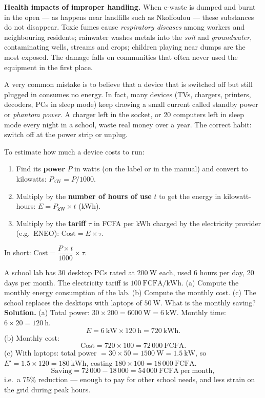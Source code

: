 \documentclass[11pt]{article}
\newcommand{\cle}[1]{{\popxbold\color{popdark}#1}}
\begin{document}
\textbf{Health impacts of improper handling.} When e-waste is dumped and burnt in the open --- as happens near landfills such as Nkolfoulou --- these substances do not disappear. Toxic fumes cause \emph{respiratory diseases} among workers and neighbouring residents; rainwater washes metals into the \emph{soil} and \emph{groundwater}, contaminating wells, streams and crops; children playing near dumps are the most exposed. The damage falls on communities that often never used the equipment in the first place.

\begin{attention}
A very common mistake is to believe that a device that is switched off but still plugged in consumes no energy. In fact, many devices (TVs, chargers, printers, decoders, PCs in sleep mode) keep drawing a small current called \cle{standby power} or \emph{phantom power}. A charger left in the socket, or 20 computers left in sleep mode every night in a school, waste real money over a year. The correct habit: switch off at the power strip or unplug.
\end{attention}

\begin{methode}
To estimate how much a device costs to run:
\begin{enumerate}
\item Find its \textbf{power} $P$ in watts (on the label or in the manual) and convert to kilowatts: $P_{\mathrm{kW}} = P / 1000$.
\item Multiply by the \textbf{number of hours of use} $t$ to get the energy in kilowatt-hours: $E = P_{\mathrm{kW}} \times t$ (kWh).
\item Multiply by the \textbf{tariff} $\tau$ in FCFA per kWh charged by the electricity provider (e.g.\ ENEO): $\text{Cost} = E \times \tau$.
\end{enumerate}
In short: $\text{Cost} = \dfrac{P \times t}{1000} \times \tau$.
\end{methode}

\begin{exoresolu}
A school lab has 30 desktop PCs rated at $200\ \mathrm{W}$ each, used 6 hours per day, 20 days per month. The electricity tariff is $100\ \mathrm{FCFA/kWh}$. (a) Compute the monthly energy consumption of the lab. (b) Compute the monthly cost. (c) The school replaces the desktops with laptops of $50\ \mathrm{W}$. What is the monthly saving?
\tcblower
\textbf{Solution.}
(a) Total power: $30 \times 200 = 6000\ \mathrm{W} = 6\ \mathrm{kW}$. Monthly time: $6 \times 20 = 120\ \mathrm{h}$.
\[ E = 6\ \mathrm{kW} \times 120\ \mathrm{h} = 720\ \mathrm{kWh}. \]
(b) Monthly cost:
\[ \text{Cost} = 720 \times 100 = 72\,000\ \mathrm{FCFA}. \]
(c) With laptops: total power $= 30 \times 50 = 1500\ \mathrm{W} = 1.5\ \mathrm{kW}$, so $E' = 1.5 \times 120 = 180\ \mathrm{kWh}$, costing $180 \times 100 = 18\,000\ \mathrm{FCFA}$.
\[ \text{Saving} = 72\,000 - 18\,000 = 54\,000\ \mathrm{FCFA\ per\ month}, \]
i.e.\ a 75\% reduction --- enough to pay for other school needs, and less strain on the grid during peak hours.
\end{exoresolu}
\end{document}
